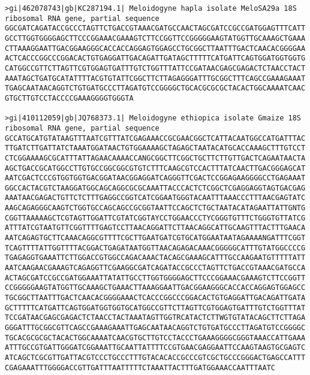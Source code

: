 \documentclass[11pt]{article}
\begin{document}
\begin{Verbatim}[commandchars=\\\{\}]
>gi|462078743|gb|KC287194.1| Meloidogyne hapla isolate MeloSA29a 18S ribosomal RNA gene, partial sequence
GGCGATCAGATACCGCCCTAGTTCTGACCGTAAACGATGCCAACTAGCGATCCGCCGATGGAGTTTCATT
GCCTTGGTGGGGAGCTTCCCGGAAACGAAAGTCTTCCGGTTCCGGGGGAAGTATGGTTGCAAAGCTGAAA
CTTAAAGGAATTGACGGAAGGGCACCACCAGGAGTGGAGCCTGCGGCTTAATTTGACTCAACACGGGGAA
ACTCACCCGGCCCGGACACTGTGAGGATTGACAGATTGATAGCTTTTTCATGATTCAGTGGATGGTGGTG
CATGGCCGTTCTTAGTTCGTGGAGTGATTTGTCTGGTTTATTCCGATAACGAGCGAGACTCTAACCTACT
AAATAGCTGATGCATATTTTACGTGTATTCGGCTTCTTAGAGGGATTTGCGGCTTTCAGCCGAAAGAAAT
TGAGCAATAACAGGTCTGTGATGCCCTTAGATGTCCGGGGCTGCACGCGCGCTACACTGGCAAAATCAAC
GTGCTTGTCCTACCCCGAAAGGGGTGGGTA

>gi|410112059|gb|JQ768373.1| Meloidogyne ethiopica isolate Gmaize 18S ribosomal RNA gene, partial sequence
GCCATGCATGTATAAGTTTAATCGTTTATCGAGAAACCGCGAACGGCTCATTACAATGGCCATGATTTAC
TTGATCTTGATTATCTAAATGGATAACTGTGGAAAAGCTAGAGCTAATACATGCACCAAAGCTTTGTCCT
CTCGGAAAAGCGCATTTATTAGAACAAAACCANGCGGCTTCGGCTGCTTCTTGTTGACTCAGAATAACTA
AGCTGACCGCATGGCCTTGTGCCGGCGGCGTGTCTTTCAAGCGTCCACTTTATCAACTTGACGGGAGCAT
AATCGACTCCCGTGGTGGTGACGGATAACGGAGGATCAGGGTTCGACTCCGGAGAAGGGGCCTGAGAAAT
GGCCACTACGTCTAAGGATGGCAGCAGGCGCGCAAATTACCCACTCTCGGCTCGAGGAGGTAGTGACGAG
AAATAACGAGACTGTTCTCTTTGAGGCCGGTCATCGGAATGGGTACAATTTAAACCCTTTAACGAGTATC
AAGCAGAGGGCAAGTCTGGTGCCAGCAGCCGCGGTAATTCCAGCTCTGCTAATACATAGAATTATTGNTG
CGGTTAAAAAGCTCGTAGTTGGATTCGTATCGGTAYCCTGGAACCCTYCGGGTGTTTCTGGGTGTTATCG
ATTTATCGTAATGTTCGGTTTTGAGTCCTTAACAGGATTCTTAACAGGCATTGCAAGTTTACTTTGAACA
AATCAGAGTGCTTCAAACAGGCGTTTTCGCTTGAATGATCGTGCATGGAATAATAGAAAANGATTTCGGT
TCAGTTTTATTGGTTTTACGGACTGAGATAATGGTTAACAGAGACAAACGGGGGCATTTGTATGGCCCCG
TGAGAGGTGAAATTCTTGGACCGTGGCCAGACAAACTACAGCGAAAGCATTTGCCAAGAATGTTTTTATT
AATCAAGAACGAAAGTCAGAGGTTCGAAGGCGATCAGATACCGCCCTAGTTCTGACCGTAAACGATGCCA
ACTAGCGATCCGCCGATGGAAATTATATTGCCTTGGTGGGGAGCTTCCCGGAAACGAAAGTCTTCCGGTT
CCGGGGGAAGTATGGTTGCAAAGCTGAAACTTAAAGGAATTGACGGAAGGGCACCACCAGGAGTGGAGCC
TGCGGCTTAATTTGACTCAACACGGGGAAACTCACCCGGCCCGGACACTGTGAGGATTGACAGATTGATA
GCTTTTTCATGATTCAGTGGATGGTGGTGCATGGCCGTTCTTAGTTCGTGGAGTGATTTGTCTGGTTTAT
TCCGATAACGAGCGAGACTCTAACCTACTAAATAGTTGGTRCATACTCTTWGTGTATACAGCTTCTTAGA
GGGATTTGCGGCGTTCAGCCGAAAGAAATTGAGCAATAACAGGTCTGTGATGCCCTTAGATGTCCGGGGC
TGCACGCGCGCTACACTGGCAAAATCAACGTGCTTGTCCTACCCTGAAAGGGGCGGGTAAACCATTGAAA
ATTTGCCGTGATTGGGATCGGAAATTGCAATTATTTTCCGTGAACGAGGAATTCCAAGTAAGTGCGAGTC
ATCAGCTCGCGTTGATTACGTCCCTGCCCTTTGTACACACCGCCCGTCGCTGCCCGGGACTGAGCCATTT
CGAGAAATTTGGGGACCGTTGATTTAATTTTTCTAAATTACTTTGATGGAAACCAATTTAATC


\end{Verbatim}
\end{document}
